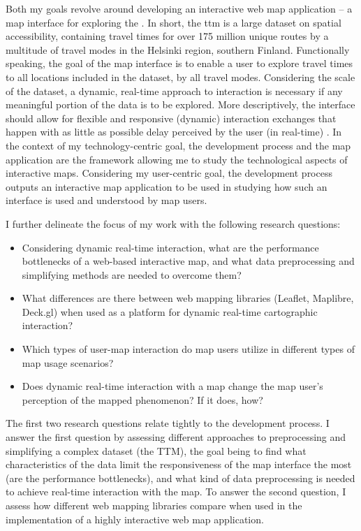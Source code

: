 Both my goals revolve around developing an interactive web map application --
a map interface for exploring the  \parencite{fin2023}.
In short, the \acrshort{ttm} is a large dataset on spatial accessibility,
containing travel times for
over 175 million unique routes by a multitude of travel modes
in the Helsinki region, southern Finland.
Functionally speaking, the goal of the map interface is to enable
a user to explore travel times to all locations included in the dataset,
by all travel modes.
Considering the scale of the dataset,
a dynamic, real-time approach to interaction is necessary
if any meaningful portion of the data is to be explored.
More descriptively, the interface should allow for flexible and
responsive (dynamic) interaction exchanges \parencite{ovi1996, rot2013b}
that happen with as little as possible delay
perceived by the user (in real-time) \parencite{seo2008}.
In the context of my technology-centric goal,
the development process and the map application are the framework
allowing me to study the technological aspects of interactive maps.
Considering my user-centric goal,
the development process outputs an interactive map application
to be used in studying how such an interface is used and understood by map users.

I further delineate the focus of my work with the following research questions:

\begin{itemize}
	\item Considering dynamic real-time interaction,
	what are the performance bottlenecks of
	a web-based interactive map,
	and what data preprocessing and simplifying methods
	are needed to overcome them?
	\item What differences are there between web mapping libraries
	(Leaflet, Maplibre, Deck.gl)
	when used as a platform for dynamic real-time cartographic interaction?
	\item Which types of user-map interaction do map users utilize
	in different types of map usage scenarios?
	\item Does dynamic real-time interaction with a map change
	the map user's perception of the mapped phenomenon? If it does, how?
\end{itemize}

The first two research questions relate tightly to the development process.
I answer the first question by assessing different approaches to
preprocessing and simplifying a complex dataset (the TTM),
the goal being to find what characteristics of the data
limit the responsiveness of the map interface the most (are the performance bottlenecks),
and what kind of data preprocessing is needed to achieve real-time interaction with the map.
To answer the second question,
I assess how different web mapping libraries compare when used in the implementation
of a highly interactive web map application.

